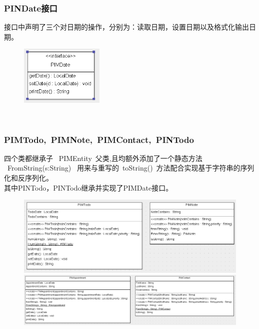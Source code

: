 \documentclass[a4paper]{article}
\begin{document}
    \subsubsection{PINDate接口}
    接口中声明了三个对日期的操作，分别为：读取日期，设置日期以及格式化输出日期。
        \begin{figure}[h]
            \centering
            \includegraphics[width=4cm]{date.png}
        \end{figure}\\
        

    \subsubsection{PIMTodo,\ PIMNote,\ PIMContact,\ PINTodo}
        四个类都继承子 \ PIMEntity\ 父类,且均额外添加了一个静态方法 \ FromString(s:String) \  用来与重写的\ toString()\ 方法配合实现基于字符串的序列化和反序列化。\\
        其中PINTodo，PINTodo继承并实现了PIMDate接口。
        \begin{figure}[h]
            \centering
            \includegraphics[width=18cm]{tandn.png}\\
            \includegraphics[width=18cm]{aandc.png}
        \end{figure}\\
\end{document}
